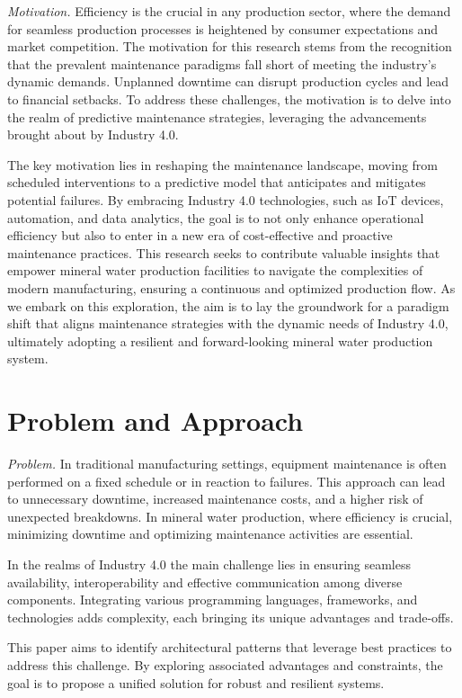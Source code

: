 \documentclass[conference]{IEEEtran}
\begin{document}
\emph{Motivation.}
Efficiency is the crucial in any production sector, where the demand for seamless production processes is heightened by consumer expectations and market competition. The motivation for this research stems from the recognition that the prevalent maintenance paradigms fall short of meeting the industry's dynamic demands. Unplanned downtime can disrupt production cycles and lead to financial setbacks. To address these challenges, the motivation is to delve into the realm of predictive maintenance strategies, leveraging the advancements brought about by Industry 4.0.

The key motivation lies in reshaping the maintenance landscape, moving from scheduled interventions to a predictive model that anticipates and mitigates potential failures. By embracing Industry 4.0 technologies, such as IoT devices, automation, and data analytics, the goal is to not only enhance operational efficiency but also to enter in a new era of cost-effective and proactive maintenance practices. This research seeks to contribute valuable insights that empower mineral water production facilities to navigate the complexities of modern manufacturing, ensuring a continuous and optimized production flow. As we embark on this exploration, the aim is to lay the groundwork for a paradigm shift that aligns maintenance strategies with the dynamic needs of Industry 4.0, ultimately adopting a resilient and forward-looking mineral water production system.
 
\section{Problem and Approach}

\label{sec:problem}
\emph{Problem.}
In traditional manufacturing settings, equipment maintenance is often performed on a fixed schedule or in reaction to failures. This approach can lead to unnecessary downtime, increased maintenance costs, and a higher risk of unexpected breakdowns. In mineral water production, where efficiency is crucial, minimizing downtime and optimizing maintenance activities are essential.  


In the realms of Industry 4.0 the main challenge lies in ensuring seamless availability, interoperability and effective communication among diverse components. Integrating various programming languages, frameworks, and technologies adds complexity, each bringing its unique advantages and trade-offs.

This paper aims to identify architectural patterns that leverage best practices to address this challenge. By exploring associated advantages and constraints, the goal is to propose a unified solution for robust and resilient systems.
\end{document}
